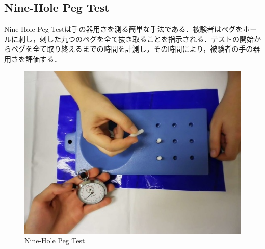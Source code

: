 \subsection*{Nine-Hole Peg Test}
Nine-Hole Peg Testは手の器用さを測る簡単な手法である．被験者はペグをホールに刺し，刺した九つのペグを全て抜き取ることを指示される．テストの開始からペグを全て取り終えるまでの時間を計測し，その時間により，被験者の手の器用さを評価する．
\begin{figure}[H]
  \centering
  \includegraphics[width=0.8\linewidth]{fig/ch1/nhpt}
  \caption{Nine-Hole Peg Test}
  \label{fig:nhpt}
\end{figure}

